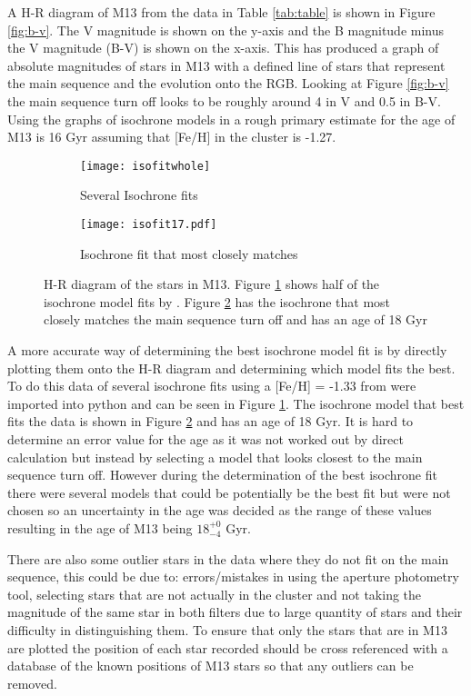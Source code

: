 \documentclass[10pt]{article}
\begin{document}
A H-R diagram of M13 from the data in Table \ref{tab:table} is shown in Figure \ref{fig:b-v}. The V magnitude is shown on the y-axis and the B magnitude minus the V magnitude (B-V) is shown on the x-axis. This has produced a graph of absolute magnitudes of stars in M13 with a defined line of stars that represent the main sequence and the evolution onto the RGB. Looking at Figure \ref{fig:b-v} the main sequence turn off looks to be roughly around 4 in V and 0.5 in B-V. Using the graphs of isochrone models in \citet[pg.73]{labhandbook} a rough primary estimate for the age of M13 is 16 Gyr assuming that [Fe/H] in the cluster is -1.27. 
\begin{figure}[H]
	\centering
	\begin{subfigure}[t]{0.35\paperwidth}
	\centering
	\texttt{[image: isofitwhole]}
	\caption{Several Isochrone fits}
	\label{fig:isowhole}
	\end{subfigure}
	\begin{subfigure}[t]{0.35\paperwidth}
	\centering
	\texttt{[image: isofit17.pdf]}
	\caption{Isochrone fit that most closely matches}
	\label{fig:iso}
	\end{subfigure}
	\caption{H-R diagram of the stars in M13. Figure \ref{fig:isowhole} shows half of the isochrone model fits by \citet{Rey_2001}. Figure \ref{fig:iso} has the isochrone that most closely matches the main sequence turn off and has an age of 18 Gyr}
	\label{fig:isochronefigures}
\end{figure}

A more accurate way of determining the best isochrone model fit is by directly plotting them onto the H-R diagram and determining which model fits the best. To do this data of several isochrone fits using a [Fe/H] = -1.33 from \citet{Rey_2001} were imported into python and can be seen in Figure \ref{fig:isowhole}. The isochrone model that best fits the data is shown in Figure \ref{fig:iso} and has an age of 18 Gyr. It is hard to determine an error value for the age as it was not worked out by direct calculation but instead by selecting a model that looks closest to the main sequence turn off. However during the determination of the best isochrone fit there were several models that could be potentially be the best fit but were not chosen so an uncertainty in the age was decided as the range of these values resulting in the age of M13 being $18^{+0}_{-4}$ Gyr.

There are also some outlier stars in the data where they do not fit on the main sequence, this could be due to: errors/mistakes in using the aperture photometry tool, selecting stars that are not actually in the cluster and not taking the magnitude of the same star in both filters due to large quantity of stars and their difficulty in distinguishing them. To ensure that only the stars that are in M13 are plotted the position of each star recorded should be cross referenced with a database of the known positions of M13 stars so that any outliers can be removed.
\end{document}
